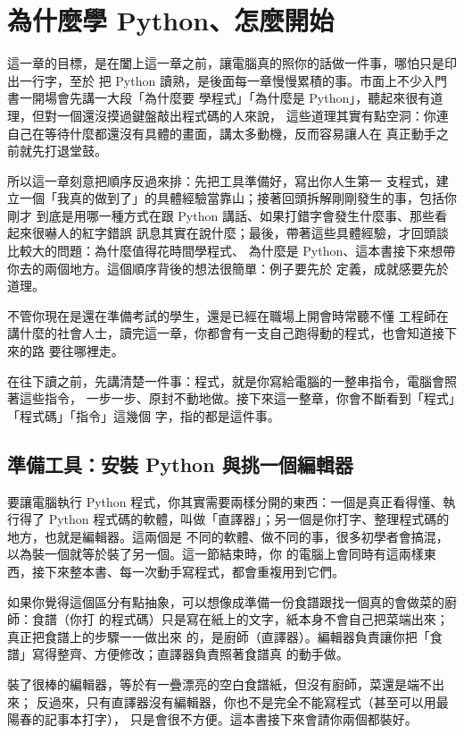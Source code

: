 \chapter{為什麼學 Python、怎麼開始}
\label{ch:introduction}

這一章的目標，是在闔上這一章之前，讓電腦真的照你的話做一件事，哪怕只是印出一行字，至於
把 Python 讀熟，是後面每一章慢慢累積的事。市面上不少入門書一開場會先講一大段「為什麼要
學程式」「為什麼是 Python」，聽起來很有道理，但對一個還沒摸過鍵盤敲出程式碼的人來說，
這些道理其實有點空洞：你連自己在等待什麼都還沒有具體的畫面，講太多動機，反而容易讓人在
真正動手之前就先打退堂鼓。

所以這一章刻意把順序反過來排：先把工具準備好，寫出你人生第一
支程式，建立一個「我真的做到了」的具體經驗當靠山；接著回頭拆解剛剛發生的事，包括你剛才
到底是用哪一種方式在跟 Python 講話、如果打錯字會發生什麼事、那些看起來很嚇人的紅字錯誤
訊息其實在說什麼；最後，帶著這些具體經驗，才回頭談比較大的問題：為什麼值得花時間學程式、
為什麼是 Python、這本書接下來想帶你去的兩個地方。這個順序背後的想法很簡單：例子要先於
定義，成就感要先於道理。

不管你現在是還在準備考試的學生，還是已經在職場上開會時常聽不懂
工程師在講什麼的社會人士，讀完這一章，你都會有一支自己跑得動的程式，也會知道接下來的路
要往哪裡走。

在往下讀之前，先講清楚一件事：程式，就是你寫給電腦的一整串指令，電腦會照著這些指令，
一步一步、原封不動地做。接下來這一整章，你會不斷看到「程式」「程式碼」「指令」這幾個
字，指的都是這件事。

\section{準備工具：安裝 Python 與挑一個編輯器}
\label{sec:setup}

要讓電腦執行 Python 程式，你其實需要兩樣分開的東西：一個是真正看得懂、執行得了 Python
程式碼的軟體，叫做「直譯器」；另一個是你打字、整理程式碼的地方，也就是編輯器。這兩個是
不同的軟體、做不同的事，很多初學者會搞混，以為裝一個就等於裝了另一個。這一節結束時，你
的電腦上會同時有這兩樣東西，接下來整本書、每一次動手寫程式，都會重複用到它們。

如果你覺得這個區分有點抽象，可以想像成準備一份食譜跟找一個真的會做菜的廚師：食譜（你打
的程式碼）只是寫在紙上的文字，紙本身不會自己把菜端出來；真正把食譜上的步驟一一做出來
的，是廚師（直譯器）。編輯器負責讓你把「食譜」寫得整齊、方便修改；直譯器負責照著食譜真
的動手做。

裝了很棒的編輯器，等於有一疊漂亮的空白食譜紙，但沒有廚師，菜還是端不出來；
反過來，只有直譯器沒有編輯器，你也不是完全不能寫程式（甚至可以用最陽春的記事本打字），
只是會很不方便。這本書接下來會請你兩個都裝好。

